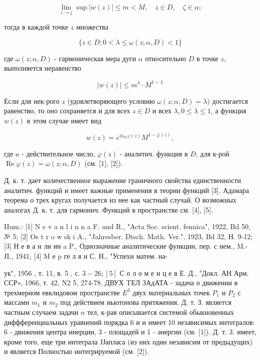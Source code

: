 \documentclass[10pt]{article}
\begin{document}
\[

\lim _{z \rightarrow \zeta} \sup |w(z)| \leqslant m<M, \quad z \in D, \quad \zeta \in \alpha ;

\]



тогда в каждой точке $z$ множества



\[

\{z \in D ; 0<\lambda \leqslant \omega(z ; \alpha, D)<1\}

\]



где $\omega(z ; \alpha, D)$ - гармоническая мера дуги $\alpha$ относительно $D$ в точке $z$, выполняется неравенство



\[

|w(z)| \leqslant m^{\lambda} \cdot M^{1-\lambda}

\]



Если для нек-рого $z$ (удовлетворяющего условию $\omega(z ; \alpha, D)=\lambda)$ достигается равенство, то оно сохраняется и для всех $z \in D$ и всех $\lambda, 0 \leqslant \lambda \leqslant 1$, а функция $w(z)$ в этом случае имеет вид



\[

w(z)=e^{i a_{m} \varphi(z)} M^{1-\varphi(z)},

\]



где $a$ - действительное число, $\varphi(z)$ - аналитич. функция в $D$, для к-рой $\operatorname{Re} \varphi(z)=\omega(z ; \alpha, D)$ (см. [1], [2]).



Д. к. т. дает количественное выражение граничного свойства единственности аналитич. функций и имеет важные применения в теории функций [3]. Адамара теорема о трех кругах получается из нее как частный случай. О возможных аналогах Д. к. т. для гармонич. Функций в пространстве см. [4], [5].



IIum.: [1] N e v a n l i n n a F. und R., "Acta Soc. scient. fennica", 1922, Bd 50, № 5; [2] Os t r o w sk i A., "Jahresber. Dtsch. Math. Ver.", 1923, Bd 32, Н. 9-12; [3] Н е в а н ли ин a P., Однозначные аналитические функции, пер. с нем., M.- ЈI., 1941; [4] M е p ге л я н С. Н., "Успехи матем. на-

ук", 1956 , т. 11, в. 5 , с. $3-26 ;[5]$ С о л о м е н ц е в Е. Д., "Докл. АН Арм. ССР», 1966, т. 42, N2 5, 274-78. ДВУХ TЕЛ ЗАдАТА - задача о движении в трехмерном евклидовом пространстве $E^{3}$ двух материальных точек $P_{1}$ и $P_{2}$ с массами $m_{1}$ и $m_{2}$ под действием ньютонова притяжения. Д. т. З. является частным случаем задачи $n$ тел, к-рая описывается системой обыкновенных диффференциальных уравнений порядка 6 и и имеет 10 независимых интегралов: 6 - движения центра инерции, 3 - площадей и 1 - әнергии (см. [1]). Д. т. 3. имеет, кроме того, еще три интеграла ЈЈапласа (из них один независим от предыдущих) и является Полностью интегрируемой (см. [2]).
\end{document}
